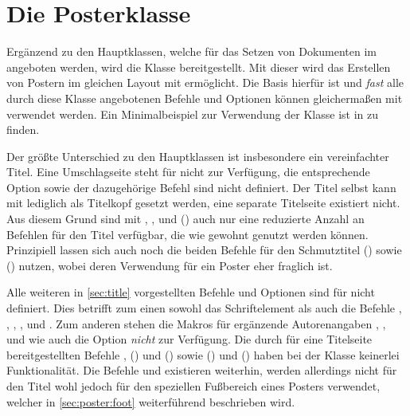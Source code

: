 \chapter[Die Posterklasse \Class*{tudscrposter}]{Die Posterklasse}
%
\begin{Bundle*}[v2.05]{}
%
\printchangedatlist%
%
Ergänzend zu den Hauptklassen, welche für das Setzen von Dokumenten im \TUDCD 
angeboten werden, wird die Klasse  bereitgestellt. Mit 
dieser wird das Erstellen von Postern im gleichen Layout mit  
ermöglicht. Die Basis hierfür ist  und \emph{fast} alle 
durch diese Klasse angebotenen Befehle und Optionen können gleichermaßen mit 
 verwendet werden. Ein Minimalbeispiel zur Verwendung der 
Klasse ist in  zu finden.

Der größte Unterschied zu den Hauptklassen ist insbesondere ein vereinfachter 
Titel. Eine Umschlagseite steht für  nicht zur Verfügung, 
die entsprechende Option  sowie der dazugehörige Befehl 
 sind nicht definiert. Der Titel selbst kann mit 
 lediglich als Titelkopf gesetzt werden, eine separate 
Titelseite existiert nicht. Aus diesem Grund sind mit  , 
,  und () 
auch nur eine reduzierte Anzahl an Befehlen für den Titel verfügbar, die wie 
gewohnt genutzt werden können. Prinzipiell lassen sich auch noch die beiden 
Befehle für den Schmutztitel () sowie 
() nutzen, wobei deren Verwendung für 
ein Poster eher fraglich ist.

Alle weiteren in \autoref{sec:title} vorgestellten Befehle und Optionen sind 
für  nicht definiert. Dies betrifft zum einen sowohl das 
Schriftelement  als auch die Befehle , 
, , ,  und  
. Zum anderen stehen die Makros für ergänzende 
Autorenangaben , , 
 und  wie auch 
die Option  \emph{nicht} zur Verfügung. Die durch 
\KOMAScript{} für eine Titelseite bereitgestellten Befehle 
, () und 
() sowie 
() und 
() haben bei der Klasse 
 keinerlei Funktionalität. Die Befehle  und 
 existieren weiterhin, werden allerdings nicht für den Titel 
wohl jedoch für den speziellen Fußbereich eines Posters verwendet, welcher in 
\autoref{sec:poster:foot} weiterführend beschrieben wird.


\end{Bundle*}
